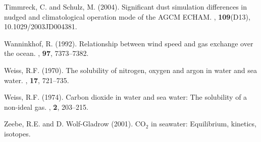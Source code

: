 \documentclass[11pt,a4paper,fleqn,twoside]{article}
\begin{document}
\begin{thebibliography}{}
Timmreck, C. and Schulz, M. (2004).
\newblock Significant dust simulation differences in nudged and climatological
  operation mode of the {AGCM ECHAM}.
, {\bf 109}(D13), 10.1029/2003JD004381.

Wanninkhof, R. (1992).
\newblock Relationship between wind speed and gas exchange over the ocean.
, {\bf 97}, 7373--7382.

Weiss, R.F. (1970).
\newblock The solubility of nitrogen, oxygen and argon in water and sea water.
, {\bf 17}, 721--735.

Weiss, R.F. (1974).
\newblock Carbon dioxide in water and sea water: The solubility of a non-ideal
  gas.
, {\bf 2}, 203--215.

Zeebe, R.E. and D. Wolf-Gladrow (2001).
\newblock CO$_2$ in seawater: Equilibrium, 
kinetics, isotopes.

\end{thebibliography}
\end{document}

